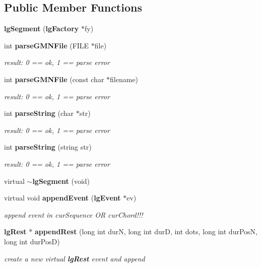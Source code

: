 \subsection*{Public Member Functions}
\begin{CompactItemize}
\item 
{\bf lg\-Segment} ({\bf lg\-Factory} $\ast$fy)
\item 
int {\bf parse\-GMNFile} (FILE $\ast$file)
\begin{CompactList}\small\item\em result: 0 == ok, 1 == parse error \item\end{CompactList}\item 
int {\bf parse\-GMNFile} (const char $\ast$filename)
\begin{CompactList}\small\item\em result: 0 == ok, 1 == parse error \item\end{CompactList}\item 
int {\bf parse\-String} (char $\ast$str)
\begin{CompactList}\small\item\em result: 0 == ok, 1 == parse error \item\end{CompactList}\item 
int {\bf parse\-String} (string str)
\begin{CompactList}\small\item\em result: 0 == ok, 1 == parse error \item\end{CompactList}\item 
virtual {\bf $\sim$lg\-Segment} (void)
\item 
virtual void {\bf append\-Event} ({\bf lg\-Event} $\ast$ev)
\begin{CompactList}\small\item\em append event in cur\-Sequence OR cur\-Chord!!! \item\end{CompactList}\item 
{\bf lg\-Rest} $\ast$ {\bf append\-Rest} (long int dur\-N, long int dur\-D, int dots, long int dur\-Pos\-N, long int dur\-Pos\-D)
\begin{CompactList}\small\item\em create a new virtual {\bf lg\-Rest} event and append \item\end{CompactList}\item 

\end{CompactItemize}
